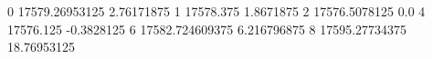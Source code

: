 0 17579.26953125 2.76171875
1 17578.375 1.8671875
2 17576.5078125 0.0
4 17576.125 -0.3828125
6 17582.724609375 6.216796875
8 17595.27734375 18.76953125
